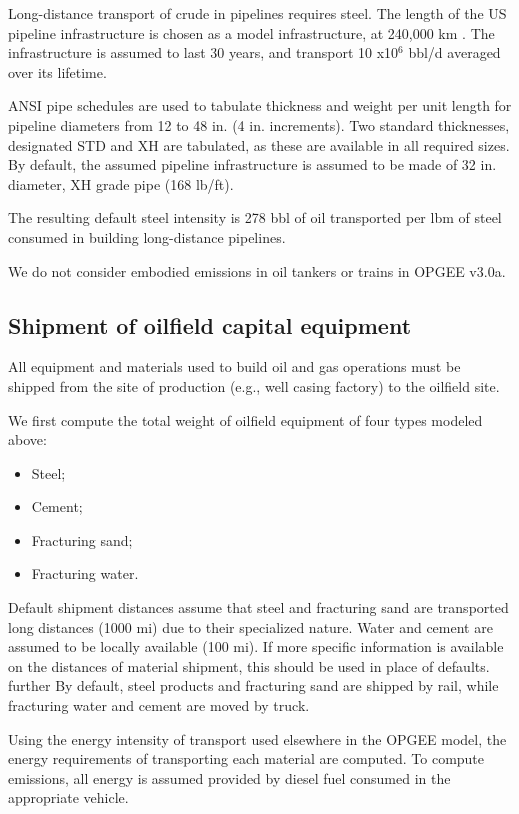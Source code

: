 \documentclass[11pt]{report}
\newcommand{\version}{v3.0a}
\begin{document}
Long-distance transport of crude in pipelines requires steel. The length of the US pipeline infrastructure is chosen as a model  infrastructure, at 240,000 km \cite{CIA2013}. The infrastructure is assumed to last 30 years, and transport 10 x10$^6$ bbl/d averaged over  its lifetime.

ANSI pipe schedules \cite[Table 9.7]{Arnold2007} are used to tabulate thickness and weight per unit length for pipeline diameters from 12 to 48 in. (4 in. increments). Two standard thicknesses, designated STD and XH are tabulated, as these are available in all required sizes. By default, the assumed pipeline infrastructure is assumed to be made of 32 in. diameter, XH grade pipe (168 lb/ft). 

The resulting default steel intensity is 278 bbl of oil  transported per lbm of steel consumed in building long-distance pipelines.

We do not consider embodied emissions in oil tankers or trains in OPGEE \version.

\subsection{Shipment of oilfield capital equipment}

All equipment and materials used to build oil and gas operations must be shipped from the site of production (e.g., well casing factory) to the oilfield site.

We first compute the total weight of oilfield equipment of four types modeled above:
\begin{itemize}
\item Steel;
\item Cement;
\item Fracturing sand;
\item Fracturing water.
\end{itemize}

Default shipment distances  assume that steel and fracturing sand are transported long distances (1000 mi) due to their specialized nature. Water and cement are assumed to be locally available (100 mi). If more specific information is available on the distances of material shipment, this should be used in place of defaults. further By default, steel products and fracturing sand are shipped by rail, while fracturing water and cement are moved by truck. 

Using the energy intensity of transport used elsewhere in the OPGEE model, the energy requirements of transporting each material are computed. To compute emissions, all energy is assumed provided by diesel fuel consumed in the appropriate vehicle. 
\end{document}
